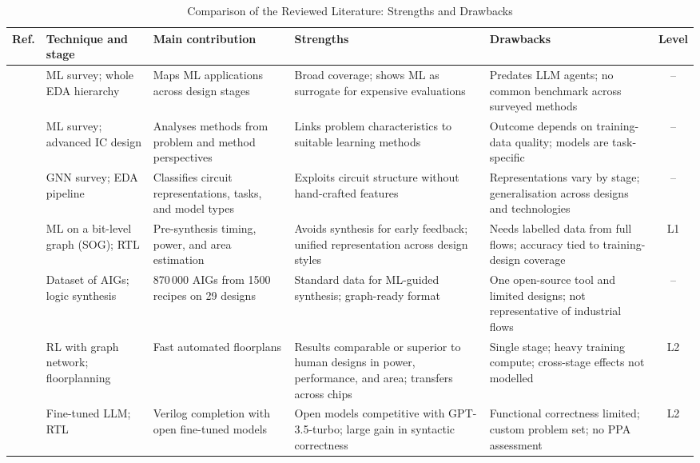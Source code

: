 \documentclass[conference]{IEEEtran}
\begin{document}
\begin{table}[!t]
\caption{Comparison of the Reviewed Literature: Strengths and Drawbacks}
\label{tab_comparison}
\centering
\footnotesize
\renewcommand{\arraystretch}{1.2}
\begin{tabularx}{\textwidth}{|c|p{2.2cm}|Y|Y|Y|c|}
\hline
\textbf{Ref.} & \textbf{Technique and stage} & \textbf{Main contribution} & \textbf{Strengths} & \textbf{Drawbacks} & \textbf{Level} \\
\hline
\cite{P1_Huang2021} & ML survey; whole EDA hierarchy & Maps ML applications across design stages & Broad coverage; shows ML as surrogate for expensive evaluations & Predates LLM agents; no common benchmark across surveyed methods & -- \\
\hline
\cite{P2_Chen2023} & ML survey; advanced IC design & Analyses methods from problem and method perspectives & Links problem characteristics to suitable learning methods & Outcome depends on training-data quality; models are task-specific & -- \\
\hline
\cite{P3_Snchez2023} & GNN survey; EDA pipeline & Classifies circuit representations, tasks, and model types & Exploits circuit structure without hand-crafted features & Representations vary by stage; generalisation across designs and technologies & -- \\
\hline
\cite{P10_Fang2023} & ML on a bit-level graph (SOG); RTL & Pre-synthesis timing, power, and area estimation & Avoids synthesis for early feedback; unified representation across design styles & Needs labelled data from full flows; accuracy tied to training-design coverage & L1 \\
\hline
\cite{P9_Chowdhury2021} & Dataset of AIGs; logic synthesis & 870\,000 AIGs from 1500 recipes on 29 designs & Standard data for ML-guided synthesis; graph-ready format & One open-source tool and limited designs; not representative of industrial flows & -- \\
\hline
\cite{P8_Mirhoseini2021} & RL with graph network; floorplanning & Fast automated floorplans & Results comparable or superior to human designs in power, performance, and area; transfers across chips & Single stage; heavy training compute; cross-stage effects not modelled & L2 \\
\hline
\cite{P11_Thakur2024} & Fine-tuned LLM; RTL & Verilog completion with open fine-tuned models & Open models competitive with GPT-3.5-turbo; large gain in syntactic correctness & Functional correctness limited; custom problem set; no PPA assessment & L2 \\

\end{tabularx}
\end{table}
\end{document}
